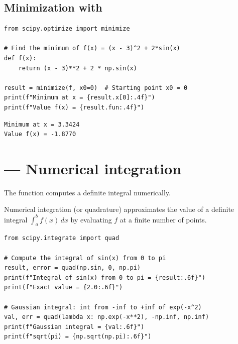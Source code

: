 \subsection{Minimization with }

\begin{codeblock}[title=\textbf{Python}]
\begin{verbatim}
from scipy.optimize import minimize

# Find the minimum of f(x) = (x - 3)^2 + 2*sin(x)
def f(x):
    return (x - 3)**2 + 2 * np.sin(x)

result = minimize(f, x0=0)  # Starting point x0 = 0
print(f"Minimum at x = {result.x[0]:.4f}")
print(f"Value f(x) = {result.fun:.4f}")
\end{verbatim}
\end{codeblock}

\begin{codeoutput}
\begin{verbatim}
Minimum at x = 3.3424
Value f(x) = -1.8770
\end{verbatim}
\end{codeoutput}

\section{ --- Numerical integration}

The function  computes a definite integral numerically.

\begin{definition}
Numerical integration (or quadrature) approximates the value of a definite
integral $\int_a^b f(x)\,dx$ by evaluating $f$ at a finite number of points.
\end{definition}

\begin{codeblock}[title=\textbf{Python}]
\begin{verbatim}
from scipy.integrate import quad

# Compute the integral of sin(x) from 0 to pi
result, error = quad(np.sin, 0, np.pi)
print(f"Integral of sin(x) from 0 to pi = {result:.6f}")
print(f"Exact value = {2.0:.6f}")

# Gaussian integral: int from -inf to +inf of exp(-x^2)
val, err = quad(lambda x: np.exp(-x**2), -np.inf, np.inf)
print(f"Gaussian integral = {val:.6f}")
print(f"sqrt(pi) = {np.sqrt(np.pi):.6f}")
\end{verbatim}
\end{codeblock}

